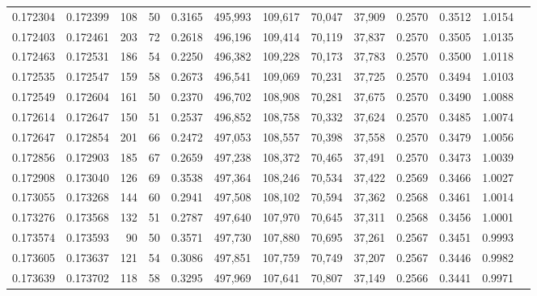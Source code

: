 \begin{tabular}{rrrrrrrrrrrrr}
0.172304 & 0.172399 &   108 &  50 &                                     0.3165 & 495,993 & 109,617 &  70,047 &  37,909 & 0.2570 & 0.3512 & 1.0154 \\
0.172403 & 0.172461 &   203 &  72 &                                     0.2618 & 496,196 & 109,414 &  70,119 &  37,837 & 0.2570 & 0.3505 & 1.0135 \\
0.172463 & 0.172531 &   186 &  54 &                                     0.2250 & 496,382 & 109,228 &  70,173 &  37,783 & 0.2570 & 0.3500 & 1.0118 \\
0.172535 & 0.172547 &   159 &  58 &                                     0.2673 & 496,541 & 109,069 &  70,231 &  37,725 & 0.2570 & 0.3494 & 1.0103 \\
0.172549 & 0.172604 &   161 &  50 &                                     0.2370 & 496,702 & 108,908 &  70,281 &  37,675 & 0.2570 & 0.3490 & 1.0088 \\
0.172614 & 0.172647 &   150 &  51 &                                     0.2537 & 496,852 & 108,758 &  70,332 &  37,624 & 0.2570 & 0.3485 & 1.0074 \\
0.172647 & 0.172854 &   201 &  66 &                                     0.2472 & 497,053 & 108,557 &  70,398 &  37,558 & 0.2570 & 0.3479 & 1.0056 \\
0.172856 & 0.172903 &   185 &  67 &                                     0.2659 & 497,238 & 108,372 &  70,465 &  37,491 & 0.2570 & 0.3473 & 1.0039 \\
0.172908 & 0.173040 &   126 &  69 &                                     0.3538 & 497,364 & 108,246 &  70,534 &  37,422 & 0.2569 & 0.3466 & 1.0027 \\
0.173055 & 0.173268 &   144 &  60 &                                     0.2941 & 497,508 & 108,102 &  70,594 &  37,362 & 0.2568 & 0.3461 & 1.0014 \\
0.173276 & 0.173568 &   132 &  51 &                                     0.2787 & 497,640 & 107,970 &  70,645 &  37,311 & 0.2568 & 0.3456 & 1.0001 \\
0.173574 & 0.173593 &    90 &  50 &                                     0.3571 & 497,730 & 107,880 &  70,695 &  37,261 & 0.2567 & 0.3451 & 0.9993 \\
0.173605 & 0.173637 &   121 &  54 &                                     0.3086 & 497,851 & 107,759 &  70,749 &  37,207 & 0.2567 & 0.3446 & 0.9982 \\
0.173639 & 0.173702 &   118 &  58 &                                     0.3295 & 497,969 & 107,641 &  70,807 &  37,149 & 0.2566 & 0.3441 & 0.9971 \\

\end{tabular}
